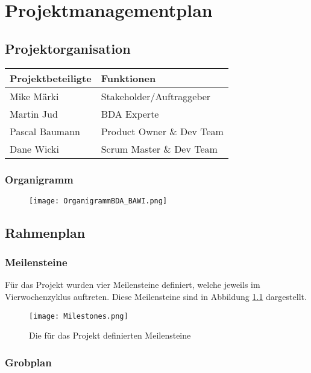 \chapter{Projektmanagementplan}

\section{Projektorganisation}

\vspace{1em}

\begin{tabularx}{\textwidth}{|X|X|}
	\hline
	\textbf{Projektbeteiligte} & \textbf{Funktionen} \\
	\hline
	Mike Märki & Stakeholder/Auftraggeber \\
	\hline
	Martin Jud & BDA Experte \\
	\hline
	Pascal Baumann & Product Owner \& Dev Team \\
	\hline
	Dane Wicki & Scrum Master \& Dev Team \\
	\hline
\end{tabularx}

\subsection{Organigramm}
\begin{figure}[h!]
	\centering
	\texttt{[image: OrganigrammBDA\_BAWI.png]}
\end{figure}


\section{Rahmenplan}
\subsection{Meilensteine}
\label{ssec:Meilensteine}
Für das Projekt wurden vier Meilensteine definiert, welche jeweils im Vierwochenzyklus auftreten. Diese Meilensteine sind in Abbildung \ref{fig:Milestones} dargestellt.

\begin{figure}[h!]
	\centering
	\texttt{[image: Milestones.png]}
	\caption{Die für das Projekt definierten Meilensteine}
	\label{fig:Milestones}
\end{figure}

\subsection{Grobplan}

